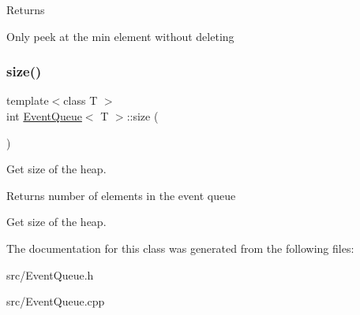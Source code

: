 \begin{DoxyReturn}{Returns}

\end{DoxyReturn}
Only peek at the min element without deleting \mbox{\label{classEventQueue_a0ce7b577678a2d182edcf24fdc91397e}} 
\subsubsection{\texorpdfstring{size()}{size()}}
{\footnotesize\ttfamily template$<$class T $>$ \\
int \hyperlink{classEventQueue}{Event\+Queue}$<$ T $>$\+::size (\begin{DoxyParamCaption}{ }\end{DoxyParamCaption})}

Get size of the heap. \begin{DoxyReturn}{Returns}
number of elements in the event queue
\end{DoxyReturn}
Get size of the heap. 

The documentation for this class was generated from the following files\+:\begin{DoxyCompactItemize}
\item 
src/Event\+Queue.\+h\item 
src/Event\+Queue.\+cpp\end{DoxyCompactItemize}
